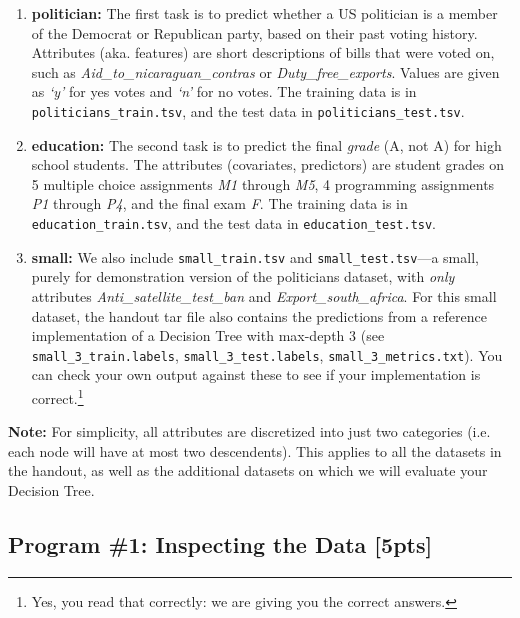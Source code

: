 \begin{enumerate}
\item \textbf{politician:}
    The first task is to predict whether a US politician is a member of the Democrat or Republican party, based on their past voting history. Attributes (aka. features) are short descriptions of bills that were voted on, such as \emph{Aid\_to\_nicaraguan\_contras} or \emph{Duty\_free\_exports}. Values are given as \emph{`y'} for yes votes and \emph{`n'} for no votes. The training data is in \lstinline{politicians_train.tsv}, and the test data in \lstinline{politicians_test.tsv}.
\item \textbf{education:}
    The second task is to predict the final \emph{grade} (A, not A) for high school students. The attributes (covariates, predictors) are student grades on 5 multiple choice assignments \emph{M1} through \emph{M5}, 4 programming assignments \emph{P1} through \emph{P4}, and the final exam \emph{F}. The training data is in \newline \lstinline{education_train.tsv}, and the test data in \lstinline{education_test.tsv}.
\item \textbf{small:}
    We also include \lstinline{small_train.tsv} and \lstinline{small_test.tsv}---a small, purely for demonstration version of the politicians dataset, with \emph{only} attributes \emph{Anti\_satellite\_test\_ban} and \newline \emph{Export\_south\_africa}.  
    For this small dataset, the handout tar file also contains the predictions from a reference implementation of a Decision Tree with max-depth 3 (see \lstinline{small_3_train.labels}, \lstinline{small_3_test.labels}, \lstinline{small_3_metrics.txt}).
    You can check your own output against these to see if your implementation is correct.\footnote{Yes, you read that correctly: we are giving you the correct answers.}
\end{enumerate}

\begin{notebox} \textbf{Note:}
For simplicity, all attributes are discretized into just two categories (i.e. each node will have at most two descendents). This applies to all the datasets in the handout, as well as the additional datasets on which we will evaluate your Decision Tree.
\end{notebox}

\newpage
\subsection{Program \#1: Inspecting the Data [5pts]}
\label{sec:inspect}

